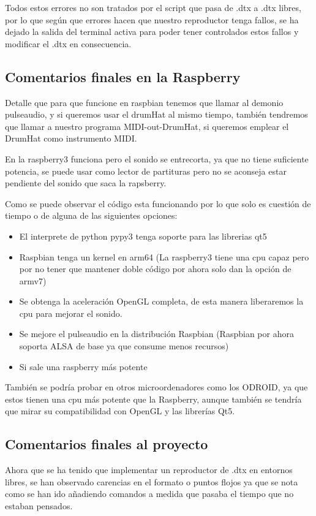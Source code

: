 \documentclass[a4paper,11pt,oneside]{book}
\begin{document}
Todos estos errores no son tratados por el script que pasa de .dtx a .dtx libres, por lo que según que errores hacen que nuestro reproductor tenga fallos, se ha dejado la salida del terminal activa para poder tener controlados estos fallos y modificar el .dtx en consecuencia.

\subsection{Comentarios finales en la Raspberry}

Detalle que para que funcione en raspbian tenemos que llamar al demonio pulseaudio, y si queremos usar el drumHat al mismo tiempo, también tendremos que llamar a nuestro programa MIDI-out-DrumHat, si queremos emplear el DrumHat como instrumento MIDI.

En la raspberry3 funciona pero el sonido se entrecorta, ya que no tiene suficiente potencia, se puede usar como lector de partituras pero no se aconseja estar pendiente del sonido que saca la rapsberry.

Como se puede observar el código esta funcionando por lo que solo es cuestión de tiempo o de alguna de las siguientes opciones:
\begin{itemize}
  \item El interprete de python pypy3 tenga soporte para las librerias qt5
  \item Raspbian tenga un kernel en arm64 (La raspberry3 tiene una cpu capaz pero por no tener que mantener doble código por ahora solo dan la opción de armv7)
  \item Se obtenga la aceleración OpenGL completa, de esta manera liberaremos la cpu para mejorar el sonido.
  \item Se mejore el pulseaudio en la distribución Raspbian (Raspbian por ahora soporta ALSA de base ya que consume menos recursos)
  \item Si sale una raspberry más potente
\end{itemize}

También se podría probar en otros microordenadores como los ODROID, ya que estos tienen una cpu más potente que la Raspberry, aunque también se tendría que mirar su compatibilidad con OpenGL y las librerías Qt5.

\subsection{Comentarios finales al proyecto}
Ahora que se ha tenido que implementar un reproductor de .dtx en entornos libres, se han observado carencias en el formato o puntos flojos ya que se nota como se han ido añadiendo comandos a medida que pasaba el tiempo que no estaban pensados.
\end{document}
